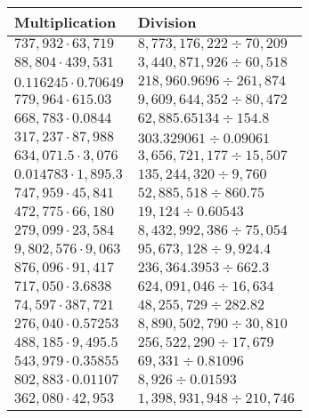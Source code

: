 \begin{longtable}[]{@{}ll@{}}
\toprule
Multiplication & Division\tabularnewline
\midrule
\endhead
\(737,932\cdot63,719\) & \(8,773,176,222÷70,209\)\tabularnewline
\(88,804\cdot439,531\) & \(3,440,871,926÷60,518\)\tabularnewline
\(0.116245\cdot0.70649\) & \(218,960.9696÷261,874\)\tabularnewline
\(779,964\cdot615.03\) & \(9,609,644,352÷80,472\)\tabularnewline
\(668,783\cdot0.0844\) & \(62,885.65134÷154.8\)\tabularnewline
\(317,237\cdot87,988\) & \(303.329061÷0.09061\)\tabularnewline
\(634,071.5\cdot3,076\) & \(3,656,721,177÷15,507\)\tabularnewline
\(0.014783\cdot1,895.3\) & \(135,244,320÷9,760\)\tabularnewline
\(747,959\cdot45,841\) & \(52,885,518÷860.75\)\tabularnewline
\(472,775\cdot66,180\) & \(19,124÷0.60543\)\tabularnewline
\(279,099\cdot23,584\) & \(8,432,992,386÷75,054\)\tabularnewline
\(9,802,576\cdot9,063\) & \(95,673,128÷9,924.4\)\tabularnewline
\(876,096\cdot91,417\) & \(236,364.3953÷662.3\)\tabularnewline
\(717,050\cdot3.6838\) & \(624,091,046÷16,634\)\tabularnewline
\(74,597\cdot387,721\) & \(48,255,729÷282.82\)\tabularnewline
\(276,040\cdot0.57253\) & \(8,890,502,790÷30,810\)\tabularnewline
\(488,185\cdot9,495.5\) & \(256,522,290÷ 17,679\)\tabularnewline
\(543,979\cdot0.35855\) & \(69,331÷0.81096\)\tabularnewline
\(802,883\cdot0.01107\) & \(8,926÷0.01593\)\tabularnewline
\(362,080\cdot42,953\) & \(1,398,931,948 ÷210,746\)\tabularnewline
\bottomrule
\end{longtable}
